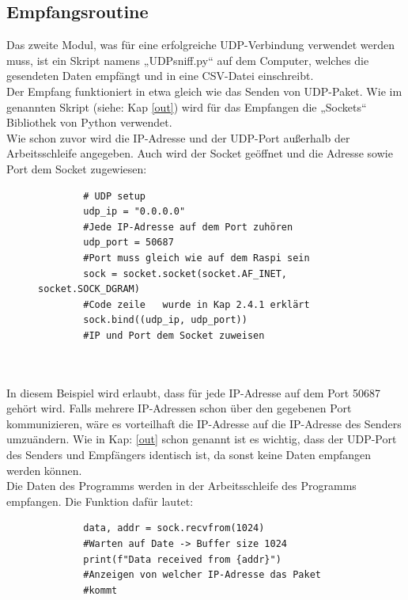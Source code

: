 \subsection{Empfangsroutine }\label{empfang}
Das zweite Modul, was für eine erfolgreiche UDP-Verbindung verwendet werden muss, ist ein Skript namens „UDPsniff.py“ auf dem Computer, welches die gesendeten Daten empfängt und in eine CSV-Datei einschreibt.\\
\vspace{3mm}
Der Empfang funktioniert in etwa gleich wie das Senden von UDP-Paket. Wie im genannten Skript (siehe: Kap \ref{out}) wird für das Empfangen die „Sockets“ Bibliothek von Python verwendet. \\
\vspace{3mm}
Wie schon zuvor wird die IP-Adresse und der UDP-Port außerhalb der Arbeitsschleife angegeben. Auch wird der Socket geöffnet und die Adresse sowie Port dem Socket zugewiesen:
\vspace{3mm}
\begin{figure}[H]
	\centering
	\begin{verbatim}
		# UDP setup
		udp_ip = "0.0.0.0" 
		#Jede IP-Adresse auf dem Port zuhören
		udp_port = 50687 
		#Port muss gleich wie auf dem Raspi sein
		sock = socket.socket(socket.AF_INET, socket.SOCK_DGRAM) 
		#Code zeile   wurde in Kap 2.4.1 erklärt
		sock.bind((udp_ip, udp_port))
		#IP und Port dem Socket zuweisen
		
		
	\end{verbatim}
\end{figure}
In diesem Beispiel wird erlaubt, dass für jede IP-Adresse auf dem Port 50687 gehört wird. Falls mehrere IP-Adressen schon über den gegebenen Port kommunizieren, wäre es vorteilhaft die IP-Adresse auf die IP-Adresse des Senders umzuändern. Wie in Kap: \ref{out} schon genannt ist es wichtig, dass der UDP-Port des Senders und Empfängers identisch ist, da sonst keine Daten empfangen werden können.\\
\vspace{3mm}
Die Daten des Programms werden in der Arbeitsschleife des Programms empfangen. Die Funktion dafür lautet:
\vspace{3mm}
\begin{figure}[H]
	\centering
	\begin{verbatim}
		data, addr = sock.recvfrom(1024)  
		#Warten auf Date -> Buffer size 1024
		print(f"Data received from {addr}") 
		#Anzeigen von welcher IP-Adresse das Paket
		#kommt
	\end{verbatim}
\end{figure}

